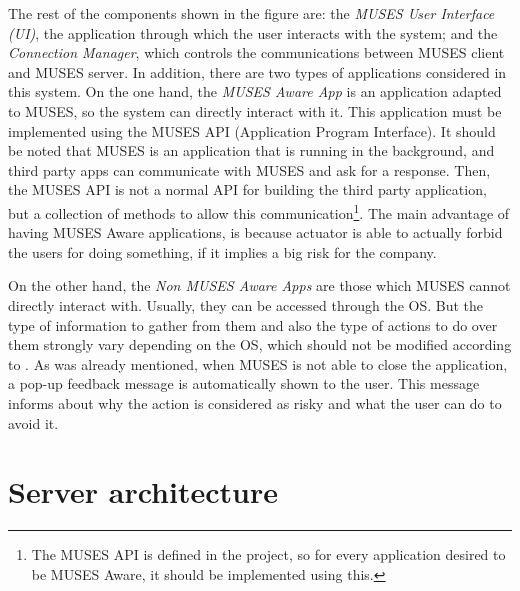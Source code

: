 The rest of the components shown in the figure are: the \textit{MUSES User Interface (UI)}, the application through which the user interacts with the system; and the \textit{Connection Manager}, which controls the communications between MUSES client and MUSES server. 
In addition, there are two types of applications considered in this system. On the one hand, the \textit{MUSES Aware App} is an application adapted to MUSES, so the system can directly interact with it. This application must be implemented using the MUSES API (Application Program Interface). It should be noted that MUSES is an application that is running in the background, and third party apps can communicate with MUSES and ask for a response. Then, the MUSES API is not a normal API for building the third party application, but a collection of methods to allow this communication\footnote{The MUSES API is defined in the project, so for every application desired to be MUSES Aware, it should be implemented using this.}.
The main advantage of having MUSES Aware applications, is because actuator is able to actually forbid the users for doing something, if it implies a big risk for the company.

On the other hand, the \textit{Non MUSES Aware Apps} are those which MUSES cannot directly interact with. Usually, they can be accessed through the OS. But the type of information to gather from them and also the type of actions to do over them strongly vary depending on the OS, which should not be modified according to  \cite{Gessner13userfriendly}.
As was already mentioned, when MUSES is not able to close the application, a pop-up feedback message is automatically shown to the user. This message informs about why the action is considered as risky and what the user can do to avoid it.


\section{Server architecture}

